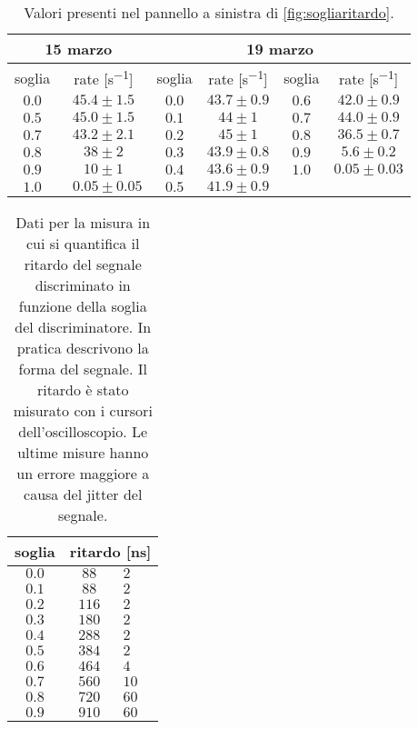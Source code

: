 \begin{table}[h]
\centering

\begin{tabular}{cc||cc|cc}
	\multicolumn{2}{c||}{15 marzo} & \multicolumn{4}{c}{19 marzo} \\
	\hline
soglia & rate [\si{s^{-1}}] & soglia & rate [\si{s^{-1}}] & soglia & rate [\si{s^{-1}}] \\
\hline
$ 0.0 $ & $ 45.4 \pm 1.5 $      & $ 0.0 $ & $ 43.7 \pm 0.9 $    & $ 0.6 $ & $ 42.0 \pm 0.9 $  \\
$ 0.5 $ & $ 45.0 \pm 1.5 $      & $ 0.1 $ & $ 44 \pm 1 $        & $ 0.7 $ & $ 44.0 \pm 0.9 $  \\
$ 0.7 $ & $ 43.2 \pm 2.1 $      & $ 0.2 $ & $ 45 \pm 1 $        & $ 0.8 $ & $ 36.5 \pm 0.7 $  \\
$ 0.8 $ & $ 38 \pm 2 $          & $ 0.3 $ & $ 43.9 \pm 0.8 $    & $ 0.9 $ & $ 5.6 \pm 0.2 $   \\
$ 0.9 $ & $ 10 \pm 1 $          & $ 0.4 $ & $ 43.6 \pm 0.9 $    & $ 1.0 $ & $ 0.05 \pm 0.03 $ \\
$ 1.0 $ & $\;\; 0.05 \pm 0.05 $ & $ 0.5 $ & $ 41.9 \pm 0.9 $    &&
\end{tabular}

\caption{Valori presenti nel pannello a sinistra di \autoref{fig:sogliaritardo}.}
\label{tab:soglia}
\end{table}



\begin{table}[h]
\centering

\begin{tabular}{c|c @{\,$\pm$\,} l}
soglia & \multicolumn{2}{c}{ritardo [\si{ns}]} \\
\hline
$ 0.0 $ & $ 88 $ & $ 2 $\\ 
$ 0.1 $ & $ 88 $ & $ 2 $\\ 
$ 0.2 $ & $ 116 $ & $ 2 $\\ 
$ 0.3 $ & $ 180 $ & $ 2 $\\ 
$ 0.4 $ & $ 288 $ & $ 2 $\\ 
$ 0.5 $ & $ 384 $ & $ 2 $\\ 
$ 0.6 $ & $ 464 $ & $ 4 $\\ 
$ 0.7 $ & $ 560 $ & $ 10 $\\ 
$ 0.8 $ & $ 720 $ & $ 60 $\\ 
$ 0.9 $ & $ 910 $ & $ 60 $\\ 
\end{tabular}

\caption{Dati per la misura in cui si quantifica il ritardo del segnale discriminato in funzione della soglia del discriminatore.
In pratica descrivono la forma del segnale.
Il ritardo è stato misurato con i cursori dell'oscilloscopio.
Le ultime misure hanno un errore maggiore a causa del jitter del segnale.}
\label{tab:rit}
\end{table}


